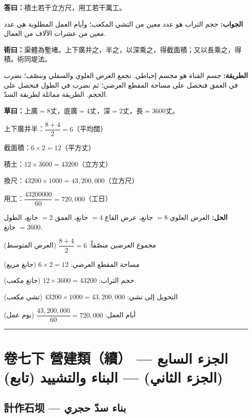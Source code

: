 \documentclass[11pt,a4paper]{article}
\newcommand{\ar}[1]{\arabicfont\beginR #1\endR}
\newcommand{\longline}{\noindent\rule{\textwidth}{0.4pt}}
\newcommand{\answer}[2]{\par\noindent%
  \begin{minipage}[t]{0.48\textwidth}\textbf{答曰：}#1\end{minipage}%
  \hfill%
  \begin{minipage}[t]{0.48\textwidth}\arabicfont\beginR\textbf{الجواب:} #2\endR\end{minipage}\par\vspace{0.2cm}}
\newcommand{\method}[2]{\par\noindent%
  \begin{minipage}[t]{0.48\textwidth}\textbf{術曰：}#1\end{minipage}%
  \hfill%
  \begin{minipage}[t]{0.48\textwidth}\arabicfont\beginR\textbf{الطريقة:} #2\endR\end{minipage}\par\vspace{0.3cm}}
\newcommand{\working}[2]{\par\noindent%
  \begin{minipage}[t]{0.48\textwidth}\textbf{草曰：}#1\end{minipage}%
  \hfill%
  \begin{minipage}[t]{0.48\textwidth}\arabicfont\beginR\textbf{الحل:} #2\endR\end{minipage}\par\vspace{0.2cm}}
\begin{document}
\answer{積土若干立方尺，用工若干萬工。}{حجم التراب هو عدد معين من التشي المكعب؛ وأيام العمل المطلوبة هي عدد معين من عشرات الآلاف من العمال.}

\method{渠體為塹堵。上下廣并之，半之，以深乘之，得截面積；又以長乘之，得積。術同堤法。}{جسم القناة هو مجسم إحباطي. نجمع العرض العلوي والسفلي وننصّف؛ نضرب في العمق فنحصل على مساحة المقطع العرضي؛ ثم نضرب في الطول فنحصل على الحجم. الطريقة مماثلة لطريقة السدّ.}

\working{上廣$=8$丈，底廣$=4$丈，深$=2$丈，長$=3600$丈。

上下廣并半：$\dfrac{8+4}{2} = 6$（平均闊）

截面積：$6 \times 2 = 12$（平方丈）

積土：$12 \times 3600 = 43200$（立方丈）

換尺：$43200 \times 1000 = 43{,}200{,}000$（立方尺）

用工：$\dfrac{43200000}{60} = 720{,}000$（工日）}{العرض العلوي $= 8$ جانغ، عرض القاع $= 4$ جانغ، العمق $= 2$ جانغ، الطول $= 3600$ جانغ.

مجموع العرضين منصّفاً: $\dfrac{8+4}{2} = 6$ (العرض المتوسط)

مساحة المقطع العرضي: $6 \times 2 = 12$ (جانغ مربع)

حجم التراب: $12 \times 3600 = 43200$ (جانغ مكعب)

التحويل إلى تشي: $43200 \times 1000 = 43{,}200{,}000$ (تشي مكعب)

أيام العمل: $\dfrac{43{,}200{,}000}{60} = 720{,}000$ (يوم عمل)}

\vspace{0.5em}
\longline
\newpage

\section{卷七下 \quad 營建類（續） — \ar{الجزء السابع (الجزء الثاني) — البناء والتشييد (تابع)}}
\label{sec:fasc7b}

\subsection{計作石坝 — \ar{بناء سدّ حجري}}
\end{document}
